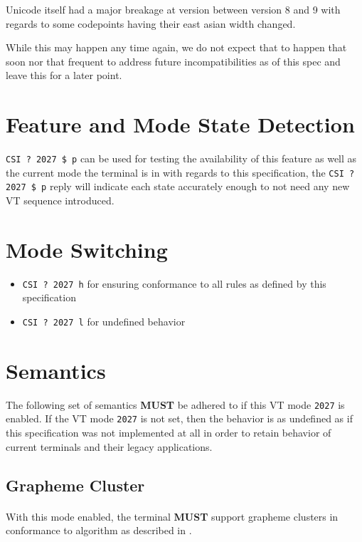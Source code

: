 \documentclass{article}
\newcommand{\code}[1]{\colorbox{light-gray}{\texttt{#1}}}
\newcommand{\DECRQM}[1]{\code{CSI ? #1 \$ p} }
\newcommand{\DECSET}[1]{\code{CSI ? #1 h} }
\newcommand{\DECRST}[1]{\code{CSI ? #1 l} }
\newcommand\VtModeNum{2027}                	%
\newcommand{\UCON}{\DECSET{\VtModeNum{}}}   %
\newcommand{\UCOFF}{\DECRST{\VtModeNum{}}}  %
\newcommand{\UCTEST}{\DECRQM{\VtModeNum{}}} %
\begin{document}
Unicode itself had a major breakage at version between version 8 and 9
with regards to some codepoints having their east asian width changed.

While this may happen any time again, we do not expect that to happen
that soon nor that frequent to address future incompatibilities
as of this spec and leave this for a later point.

\section{Feature and Mode State Detection}

\UCTEST \cite{DECRQM} can be used for testing the availability of this
feature as well as the current mode the terminal is in with regards
to this specification, the \UCTEST reply will indicate each state
accurately enough to not need any new VT sequence introduced.

\section{Mode Switching}

\begin{itemize}
	\item \UCON{} \cite{SM} for ensuring conformance to all rules as defined by this specification
	\item \UCOFF{} \cite{RM} for undefined behavior
\end{itemize}

\section{Semantics}

The following set of semantics \textbf{MUST} be adhered to if this
VT mode \code{\VtModeNum} is enabled.
If the VT mode \code{\VtModeNum} is not set, then the behavior is as undefined
as if this specification was not implemented at all in order to retain
behavior of current terminals and their legacy applications.

\subsection{Grapheme Cluster}

\paragraph*{}
With this mode enabled, the terminal \textbf{MUST} support grapheme clusters
in conformance to algorithm as described in \cite{UTS-29}.
\end{document}
